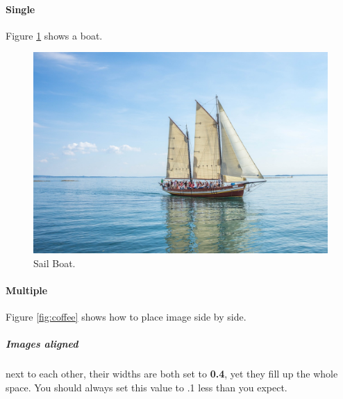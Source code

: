 \documentclass{report}[a4paper,12pt] %
\begin{document}
\paragraph{Single}

Figure \ref{fig:sailboat} shows a boat. %

\begin{figure}[h]
  \includegraphics[width=\linewidth,scale=1.5]{boat.jpg}
  \caption{Sail Boat.}
  \label{fig:sailboat} %
\end{figure}

\newpage
\paragraph{Multiple}
Figure \ref{fig:coffee} shows how to place image side by side.

\subparagraph{Images aligned} next to each other, their widths are both set to \textbf{0.4}, yet they fill up the whole space.
You should always set this value to .1 less than you expect.
\end{document}
